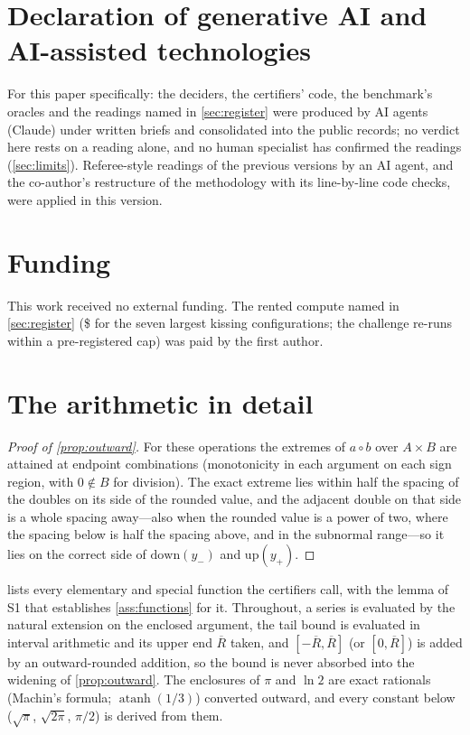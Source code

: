 \documentclass[preprint,11pt,a4paper]{elsarticle}
\theoremstyle{definition}
\newcommand{\supp}[1]{S#1}
\begin{document}
\section*{Declaration of generative AI and AI-assisted technologies}
\cmaideclaration{} For this paper specifically: the deciders, the certifiers' code, the benchmark's oracles and the readings named in \cref{sec:register} were produced by AI agents (Claude) under written briefs and consolidated into the public records; no verdict here rests on a reading alone, and no human specialist has confirmed the readings (\cref{sec:limits}). Referee-style readings of the previous versions by an AI agent, and the co-author's restructure of the methodology with its line-by-line code checks, were applied in this version.

\section*{Funding}
This work received no external funding. The rented compute named in \cref{sec:register} (\$\MtKwGpuCost{} for the seven largest kissing configurations; the challenge re-runs within a pre-registered cap) was paid by the first author.

\appendix
\setcounter{table}{0}
\section{The arithmetic in detail}\label{app:arith}

\begin{proof}[Proof of \cref{prop:outward}]
For these operations the extremes of $a\circ b$ over $A\times B$ are attained at endpoint combinations (monotonicity in each argument on each sign region, with $0\notin B$ for division). The exact extreme lies within half the spacing of the doubles on its side of the rounded value, and the adjacent double on that side is a whole spacing away---also when the rounded value is a power of two, where the spacing below is half the spacing above, and in the subnormal range---so it lies on the correct side of $\mathrm{down}(y_-)$ and $\mathrm{up}(y_+)$.
\end{proof}

 lists every elementary and special function the certifiers call, with the lemma of \supp{1} that establishes \cref{ass:functions} for it. Throughout, a series is evaluated by the natural extension on the enclosed argument, the tail bound is evaluated in interval arithmetic and its upper end $\overline{R}$ taken, and $[-\overline R,\overline R]$ (or $[0,\overline R]$) is added by an outward-rounded addition, so the bound is never absorbed into the widening of \cref{prop:outward}. The enclosures of $\pi$ and $\ln 2$ are exact rationals (Machin's formula; $\operatorname{atanh}(1/3)$) converted outward, and every constant below ($\sqrt\pi$, $\sqrt{2\pi}$, $\pi/2$) is derived from them.
\end{document}
